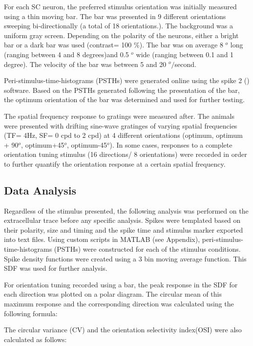 	For each SC neuron, the preferred stimulus orientation was initially measured using a thin moving bar. The bar was presented in 9 different orientations sweeping bi-directionally (a total of 18 orientations.). The background was a uniform gray screen. Depending on the polarity of the neurons, either a bright bar or a dark bar was used (contrast= 100 \%). The bar was on average 8 $^{o}$ long (ranging between 4 and 8 degrees)and 0.5 $^{o}$ wide (ranging between 0.1 and 1 degree). The velocity of the bar was between 5 and 20 $^{o}/$second. 
	
	Peri-stimulus-time-histograms (PSTHs) were generated online using the spike 2 () software. Based on the PSTHs generated following the presentation of the bar, the optimum orientation of the bar was determined and used for further testing.
	
	The spatial frequency response to gratings were measured after. The animals were presented with drifting sine-wave gratinges of varying spatial frequencies (TF= 4Hz, SF= 0 cpd to 2 cpd) at 4 different orientations (optimum, optimum + 90$^{o}$, optimum+45$^{o}$, optimum-45$^{o}$). In some cases, responses to a complete orientation tuning stimulus (16 directions/ 8 orientations) were recorded in order to further quantify the orientation response at a certain spatial frequency.
	
	\subsection{Data Analysis}
	
	Regardless of the stimulus presented, the following analysis was performed on the extracellular trace before any specific analysis. Spikes were templated based on their polarity, size and timing and the spike time and stimulus marker exported into text files. Using custom scripts in MATLAB (see Appendix), peri-stimulus-time-histograms (PSTHs) were constructed for each of the stimulus conditions. Spike density functions were created using a 3 bin moving average function. This SDF was used for further analysis.
	
	For orientation tuning recorded using a bar, the peak response in the SDF for each direction was plotted on a polar diagram. The circular mean of this maximum response and the corresponding direction was calculated using the following formula:
		
	 The circular variance (CV) and the orientation selectivity index(OSI) were also calculated as follows:
	 

